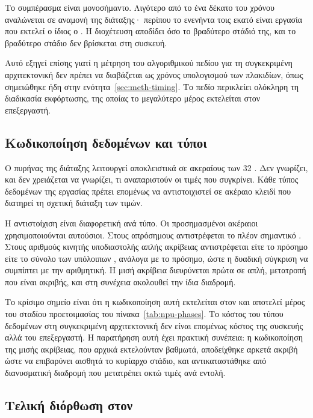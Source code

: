 Το συμπέρασμα είναι μονοσήμαντο. Λιγότερο από το ένα δέκατο του χρόνου
αναλώνεται σε αναμονή της διάταξης· περίπου το ενενήντα τοις εκατό είναι εργασία
που εκτελεί ο ίδιος ο . Η διοχέτευση αποδίδει όσο το βραδύτερο στάδιό
της, και το βραδύτερο στάδιο δεν βρίσκεται στη συσκευή.

Αυτό εξηγεί επίσης γιατί η μέτρηση του αλγοριθμικού πεδίου για τη συγκεκριμένη
αρχιτεκτονική δεν πρέπει να διαβάζεται ως χρόνος υπολογισμού των πλακιδίων, όπως
σημειώθηκε ήδη στην ενότητα~\ref{sec:meth-timing}. Το πεδίο περικλείει ολόκληρη
τη διαδικασία εκφόρτωσης, της οποίας το μεγαλύτερο μέρος εκτελείται στον
επεξεργαστή.



\subsection{Κωδικοποίηση δεδομένων και τύποι}
\label{sec:npu-encoding}

Ο πυρήνας της διάταξης λειτουργεί αποκλειστικά σε ακεραίους των 32 . Δεν
γνωρίζει, και δεν χρειάζεται να γνωρίζει, τι αναπαριστούν οι τιμές που
συγκρίνει. Κάθε τύπος δεδομένων της εργασίας πρέπει επομένως να αντιστοιχιστεί
σε ακέραιο κλειδί που διατηρεί τη σχετική διάταξη των τιμών.

Η αντιστοίχιση είναι διαφορετική ανά τύπο. Οι προσημασμένοι ακέραιοι
χρησιμοποιούνται αυτούσιοι. Στους απρόσημους αντιστρέφεται το πλέον σημαντικό
. Στους αριθμούς κινητής υποδιαστολής απλής ακρίβειας αντιστρέφεται είτε
το πρόσημο είτε το σύνολο των υπόλοιπων , ανάλογα με το πρόσημο, ώστε η
δυαδική σύγκριση να συμπίπτει με την αριθμητική. Η μισή ακρίβεια διευρύνεται
πρώτα σε απλή, μετατροπή που είναι ακριβής, και στη συνέχεια ακολουθεί την ίδια
διαδρομή.

Το κρίσιμο σημείο είναι ότι η κωδικοποίηση αυτή εκτελείται στον  και
αποτελεί μέρος του σταδίου προετοιμασίας του πίνακα~\ref{tab:npu-phases}. Το
κόστος του τύπου δεδομένων στη συγκεκριμένη αρχιτεκτονική δεν είναι επομένως
κόστος της συσκευής αλλά του επεξεργαστή. Η παρατήρηση αυτή έχει πρακτική
συνέπεια: η κωδικοποίηση της μισής ακρίβειας, που αρχικά εκτελούνταν βαθμωτά,
αποδείχθηκε αρκετά ακριβή ώστε να επιβαρύνει αισθητά το κυρίαρχο στάδιο, και
αντικαταστάθηκε από διανυσματική διαδρομή που μετατρέπει οκτώ τιμές ανά εντολή.

\subsection{Τελική διόρθωση στον }
\label{sec:npu-refinement}

